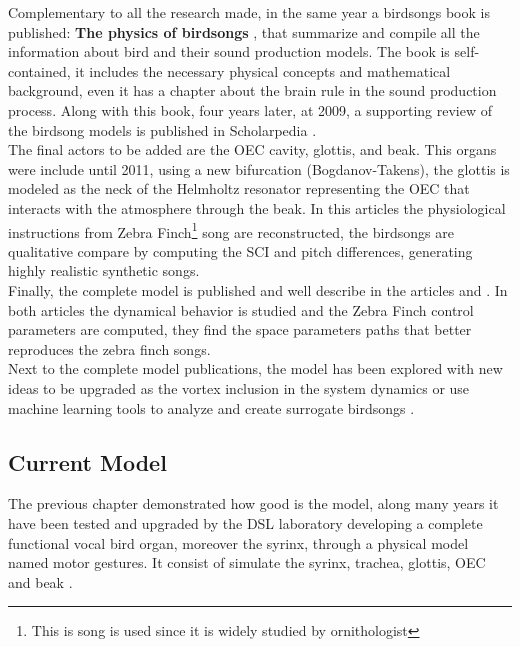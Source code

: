\vspace{10pt}

Complementary to all the research made, in the same year a birdsongs book is published: \textbf{The physics of birdsongs} \cite{book_birdsongs}, that summarize and compile all the information about bird and their sound production models. The book is self-contained, it includes the necessary physical concepts and mathematical background, even it has a chapter about the brain rule in the sound production process. Along with this book, four years later, at 2009, a supporting review of the birdsong models is published in Scholarpedia \cite{scholarpedia_syrinx}.\\


The final actors to be added are the OEC cavity, glottis, and beak. This organs were include until 2011, using a new bifurcation (Bogdanov-Takens), the glottis is modeled as the neck of the Helmholtz resonator representing the OEC that interacts with the atmosphere through the beak. In this articles the physiological instructions from Zebra Finch\footnote{This is song is used since it is widely studied by ornithologist} song are reconstructed, the birdsongs are qualitative compare by computing the SCI and pitch differences, generating highly realistic synthetic songs.\\


Finally, the complete model is published and well describe in the articles \cite{Amador2014} and \cite{complete_model}. In both articles the dynamical behavior is studied and the Zebra Finch control parameters are computed, they find the space parameters paths that better reproduces the zebra finch songs. \\

Next to the complete model publications, the model has been explored with new ideas to be upgraded as the vortex inclusion in the system dynamics \cite{vortex} or use machine learning tools to analyze and create surrogate birdsongs \cite{ML1, ML2, ML3}.  


\subsection{Current Model}

The previous chapter demonstrated how good is the model, along many years it have been tested and upgraded by the DSL laboratory developing a complete functional vocal bird organ, moreover the syrinx, through a physical model named motor gestures. It consist of simulate the syrinx, trachea, glottis, OEC and beak \cite{complete_model}.

